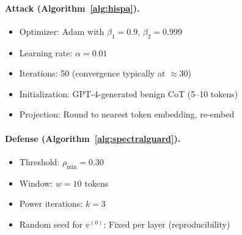 \documentclass[10pt,twocolumn]{article}
\begin{document}
\paragraph{Attack (Algorithm~\ref{alg:hispa}).}
\begin{itemize}
\item Optimizer: Adam with $\beta_1=0.9$, $\beta_2=0.999$
\item Learning rate: $\alpha=0.01$
\item Iterations: 50 (convergence typically at $\approx 30$)
\item Initialization: GPT-4-generated benign CoT (5--10 tokens)
\item Projection: Round to nearest token embedding, re-embed
\end{itemize}

\paragraph{Defense (Algorithm~\ref{alg:spectralguard}).}
\begin{itemize}
\item Threshold: $\rho_{\min}=0.30$
\item Window: $w=10$ tokens
\item Power iterations: $k=3$
\item Random seed for $v^{(0)}$: Fixed per layer (reproducibility)
\end{itemize}
\end{document}
